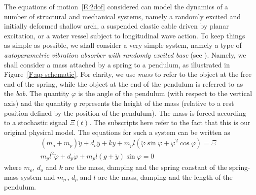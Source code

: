The equations of motion~\eqref{E:2dof} considered can model the dynamics of a number of structural and mechanical systems, namely a randomly excited and initially deformed shallow arch, a suspended elastic cable driven by planar excitation, or a water vessel subject to longitudinal wave action. To keep things as simple as possible, we shall consider a very simple system, namely a type of \emph{autoparametric vibration absorber with randomly excited base} (see \citep{hatwal83:_forced_nonlin_oscil_of_autop_1}). Namely, we shall consider a mass attached by a spring to a pendulum, as illustrated in Figure~\ref{F:ap schematic}. For clarity, we use \emph{mass} to refer to the object at the free end of the spring, while the object at the end of the pendulum is referred to as the \emph{bob}. The quantity $\varphi$ is the angle of the pendulum (with respect to the vertical axis) and the quantity $y$ represents the height of the mass (relative to a rest position defined by the position of the pendulum). The mass is forced according to a stochastic signal $\Xi(t)$. The subscripts here refer to the fact that this is our original physical model. The equations for such a system can be written as
\begin{equation}
\label{e:absorber}
\begin{gathered}
(m_o + m_p) \ddot y + d_o \dot y + k y + m_p l (\ddot \varphi \sin \varphi + {\dot \varphi}^2 \cos \varphi) = \Xi\\
m_p l^2 \ddot \varphi + d_p \dot\varphi + m_p l (g + \ddot y) \sin \varphi = 0
\end{gathered}
\end{equation}
where $m_o$, $d_o$ and $k$ are the mass, damping and the spring constant of the spring-mass system and $m_p \,$, $d_p$ and $l$ are the mass, damping and the length of the pendulum.
